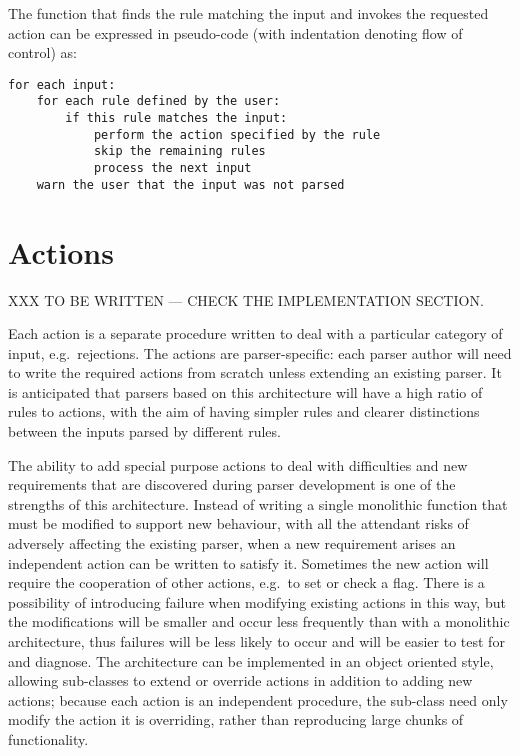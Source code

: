 The function that finds the rule matching the input and invokes the
requested action can be expressed in pseudo-code (with indentation denoting
flow of control) as:

\begin{verbatim}
for each input:
    for each rule defined by the user: 
        if this rule matches the input:
            perform the action specified by the rule
            skip the remaining rules
            process the next input
    warn the user that the input was not parsed
\end{verbatim}

\section{Actions}

\label{actions in architecture}

XXX TO BE WRITTEN --- CHECK THE IMPLEMENTATION SECTION\@.

Each action is a separate procedure written to deal with a particular
category of input, e.g.\ rejections.  The actions are parser-specific: each
parser author will need to write the required actions from scratch unless
extending an existing parser.  It is anticipated that parsers based on this
architecture will have a high ratio of rules to actions, with the aim of
having simpler rules and clearer distinctions between the inputs parsed by
different rules.  

The ability to add special purpose actions to deal with difficulties and
new requirements that are discovered during parser development is one of
the strengths of this architecture.  Instead of writing a single monolithic
function that must be modified to support new behaviour, with all the
attendant risks of adversely affecting the existing parser, when a new
requirement arises an independent action can be written to satisfy it.
Sometimes the new action will require the cooperation of other actions,
e.g.\ to set or check a flag.  There is a possibility of introducing
failure when modifying existing actions in this way, but the modifications
will be smaller and occur less frequently than with a monolithic
architecture, thus failures will be less likely to occur and will be easier
to test for and diagnose.  The architecture can be implemented in an object
oriented style, allowing sub-classes to extend or override actions in
addition to adding new actions; because each action is an independent
procedure, the sub-class need only modify the action it is overriding,
rather than reproducing large chunks of functionality.

